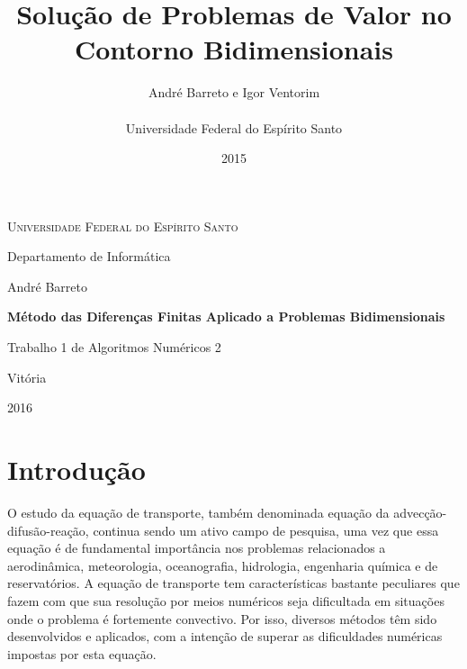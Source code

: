 \documentclass[
	11pt,				%
	oneside,			%
	a4paper,			%
	english,			%
	brazil,				%
	]{article}
\title{\textbf{Solução de Problemas de Valor no Contorno Bidimensionais}}
\author{
André Barreto e Igor Ventorim\\\\
\normalsize Universidade Federal do Espírito Santo\\
}
\date{2015}
\begin{document}


\frenchspacing

\graphicspath{ {Imagens/} }

\begin{titlepage}
	\centering
	{\scshape \large Universidade Federal do Espírito Santo\par}
	{\large Departamento de Informática\par}
	\vspace{1cm}
	{\large André Barreto\par}
	
	\vfill
	
	{\LARGE \bfseries Método das Diferenças Finitas Aplicado a
Problemas Bidimensionais\par}
	\vspace{1cm}
	{\large Trabalho 1 de Algoritmos Numéricos 2\par}

	\vfill

	{\large Vitória\par}
	{\large 2016\par}
\end{titlepage}
\addtocounter{page}{1}

\section{Introdução}
O estudo da equação de transporte, também denominada equação da 
advecção-difusão-reação, continua sendo um ativo campo de pesquisa, uma vez que 
essa equação é de fundamental importância nos problemas relacionados a 
aerodinâmica,  meteorologia, oceanografia, hidrologia, engenharia química e
de reservatórios. A equação de transporte tem características bastante 
peculiares que fazem com que sua  resolução por meios numéricos seja 
dificultada em situações onde o problema é fortemente convectivo. Por isso, 
diversos métodos têm sido desenvolvidos e aplicados, com a intenção de superar 
as dificuldades numéricas impostas por esta equação.
\end{document}
